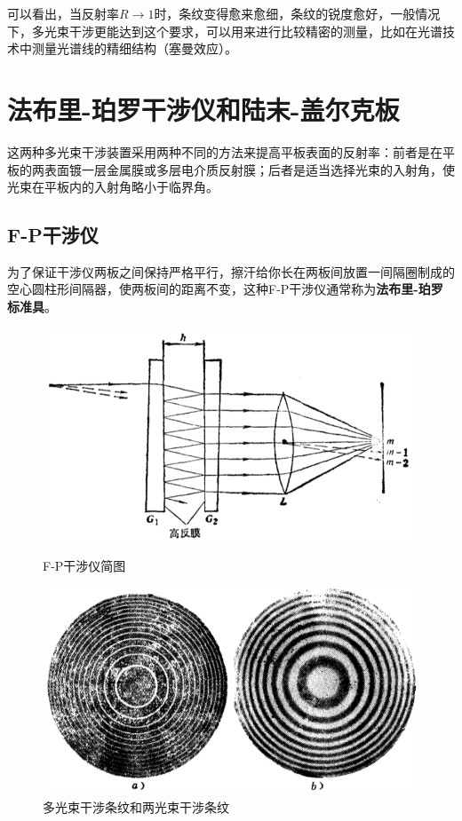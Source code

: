 \documentclass[UTF8]{ctexart}
\begin{document}
\noindent 可以看出，当反射率$ R \rightarrow 1 $时，条纹变得愈来愈细，条纹的锐度愈好，一般情况下，多光束干涉更能达到这个要求，可以用来进行比较精密的测量，比如在光谱技术中测量光谱线的精细结构（塞曼效应）。

\section{法布里-珀罗干涉仪和陆末-盖尔克板}
这两种多光束干涉装置采用两种不同的方法来提高平板表面的反射率：前者是在平板的两表面镀一层金属膜或多层电介质反射膜；后者是适当选择光束的入射角，使光束在平板内的入射角略小于临界角。

\subsection{F-P干涉仪}
为了保证干涉仪两板之间保持严格平行，擦汗给你长在两板间放置一间隔圈制成的空心圆柱形间隔器，使两板间的距离不变，这种F-P干涉仪通常称为\textbf{法布里-珀罗标准具}。
\begin{figure}[H]
	\centering
	\includegraphics[width=12cm]{Interference_F-P.png}
	\caption{F-P干涉仪简图}
	\label{figure_F-P}
	\includegraphics[width=12cm]{Interference_circle.png}
	\caption{多光束干涉条纹和两光束干涉条纹}
	\label{figure_circle}
\end{figure}
\end{document}
